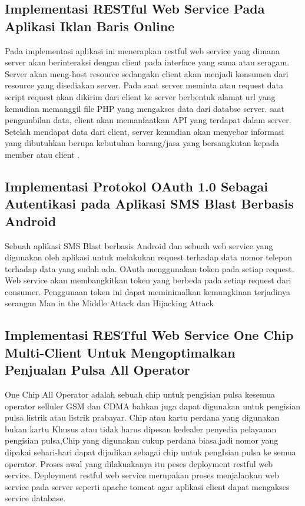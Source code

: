 \subsection{Implementasi RESTful Web Service Pada Aplikasi Iklan Baris Online}
Pada implementasi aplikasi ini menerapkan restful web service yang dimana server akan berinteraksi dengan client pada interface yang sama atau seragam. Server akan meng-host resource sedangakn client akan menjadi konsumen dari resource yang disediakan server. Pada saat server meminta atau request data script request akan dikirim dari client ke server berbentuk alamat url yang kemudian memanggil file PHP yang mengakses data dari databse server. saat pengambilan data, client akan memanfaatkan API yang terdapat dalam server. Setelah mendapat data dari client, server kemudian akan menyebar informasi yang dibutuhkan berupa kebutuhan barang/jasa yang bersangkutan kepada member atau client \cite{fauziah2014aplikasi}.

\subsection{Implementasi Protokol OAuth 1.0 Sebagai Autentikasi pada Aplikasi SMS Blast Berbasis Android}
Sebuah aplikasi SMS Blast berbasis Android dan sebuah web service yang digunakan oleh aplikasi untuk melakukan request terhadap data nomor telepon terhadap data yang sudah ada. OAuth menggunakan token pada setiap request. Web service akan membangkitkan token yang berbeda pada setiap request dari consumer. Penggunaan token ini dapat meminimalkan kemungkinan terjadinya serangan Man in the Middle Attack dan Hijacking Attack
\cite{saputra2017implementasi}

\subsection{Implementasi RESTful Web Service One Chip Multi-Client Untuk Mengoptimalkan Penjualan Pulsa All Operator}
One  Chip  All  Operator adalah sebuah chip untuk pengisian pulsa kesemua operator selluler GSM dan CDMA bahkan juga dapat digunakan untuk pengisian pulsa listrik atau listrik prabayar. Chip atau kartu perdana  yang  digunakan bukan kartu Khusus atau tidak harus dipesan kedealer penyedia pelayanan pengisian pulsa,Chip yang   digunakan cukup perdana biasa,jadi nomor  yang dipakai sehari-hari dapat dijadikan sebagai chip untuk pengIsian pulsa ke semua operator. Proses awal yang dilakuakanya itu peses deployment restful  web  service. Deployment  restful web service  merupakan proses menjalankan web service pada server seperti apache tomcat agar aplikasi client dapat mengakses service database\cite{indrawan2017implementasi}.

